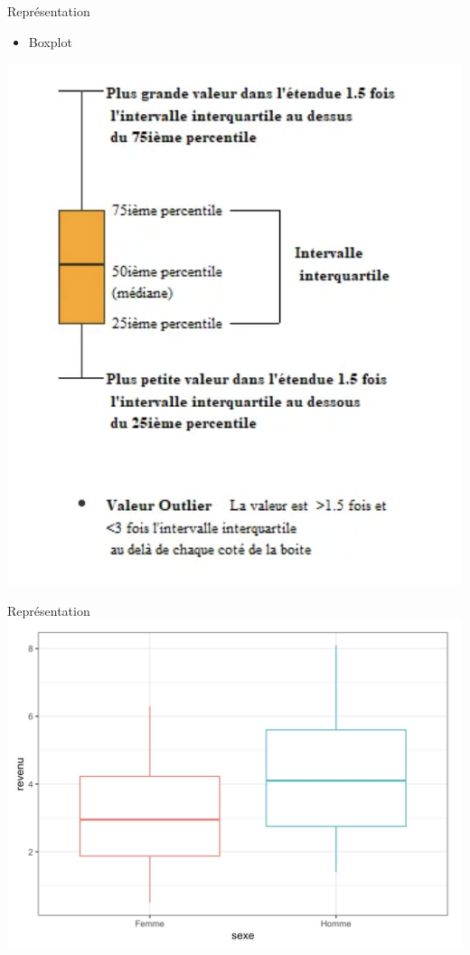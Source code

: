\documentclass[
  ignorenonframetext,
]{beamer}
\providecommand{\tightlist}{%
  \setlength{\itemsep}{0pt}\setlength{\parskip}{0pt}}
\begin{document}
\begin{frame}{Représentation}
\protect\hypertarget{repruxe9sentation}{}
\begin{itemize}
\tightlist
\item
  Boxplot
\end{itemize}

\includegraphics{../../Images/boxplot_interpretation.png}
\end{frame}

\begin{frame}{Représentation}
\protect\hypertarget{repruxe9sentation-1}{}
\includegraphics{../../Images/cours4_graph1.jpg}
\end{frame}
\end{document}
